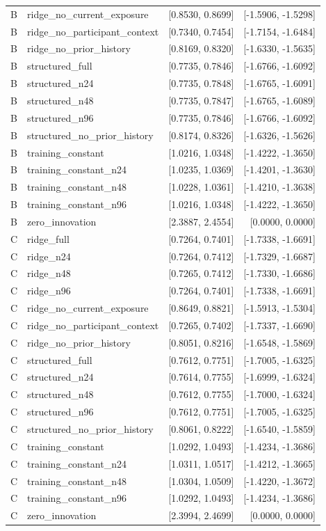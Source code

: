 \documentclass[9pt,a4paper]{extarticle}
\begin{document}
\begin{longtable}{llrr}
B & ridge\_no\_current\_exposure & [0.8530, 0.8699] & [-1.5906, -1.5298] \\
B & ridge\_no\_participant\_context & [0.7340, 0.7454] & [-1.7154, -1.6484] \\
B & ridge\_no\_prior\_history & [0.8169, 0.8320] & [-1.6330, -1.5635] \\
B & structured\_full & [0.7735, 0.7846] & [-1.6766, -1.6092] \\
B & structured\_n24 & [0.7735, 0.7848] & [-1.6765, -1.6091] \\
B & structured\_n48 & [0.7735, 0.7847] & [-1.6765, -1.6089] \\
B & structured\_n96 & [0.7735, 0.7846] & [-1.6766, -1.6092] \\
B & structured\_no\_prior\_history & [0.8174, 0.8326] & [-1.6326, -1.5626] \\
B & training\_constant & [1.0216, 1.0348] & [-1.4222, -1.3650] \\
B & training\_constant\_n24 & [1.0235, 1.0369] & [-1.4201, -1.3630] \\
B & training\_constant\_n48 & [1.0228, 1.0361] & [-1.4210, -1.3638] \\
B & training\_constant\_n96 & [1.0216, 1.0348] & [-1.4222, -1.3650] \\
B & zero\_innovation & [2.3887, 2.4554] & [0.0000, 0.0000] \\
C & ridge\_full & [0.7264, 0.7401] & [-1.7338, -1.6691] \\
C & ridge\_n24 & [0.7264, 0.7412] & [-1.7329, -1.6687] \\
C & ridge\_n48 & [0.7265, 0.7412] & [-1.7330, -1.6686] \\
C & ridge\_n96 & [0.7264, 0.7401] & [-1.7338, -1.6691] \\
C & ridge\_no\_current\_exposure & [0.8649, 0.8821] & [-1.5913, -1.5304] \\
C & ridge\_no\_participant\_context & [0.7265, 0.7402] & [-1.7337, -1.6690] \\
C & ridge\_no\_prior\_history & [0.8051, 0.8216] & [-1.6548, -1.5869] \\
C & structured\_full & [0.7612, 0.7751] & [-1.7005, -1.6325] \\
C & structured\_n24 & [0.7614, 0.7755] & [-1.6999, -1.6324] \\
C & structured\_n48 & [0.7612, 0.7755] & [-1.7000, -1.6324] \\
C & structured\_n96 & [0.7612, 0.7751] & [-1.7005, -1.6325] \\
C & structured\_no\_prior\_history & [0.8061, 0.8222] & [-1.6540, -1.5859] \\
C & training\_constant & [1.0292, 1.0493] & [-1.4234, -1.3686] \\
C & training\_constant\_n24 & [1.0311, 1.0517] & [-1.4212, -1.3665] \\
C & training\_constant\_n48 & [1.0304, 1.0509] & [-1.4220, -1.3672] \\
C & training\_constant\_n96 & [1.0292, 1.0493] & [-1.4234, -1.3686] \\
C & zero\_innovation & [2.3994, 2.4699] & [0.0000, 0.0000] \\
\bottomrule
\end{longtable}
\end{document}
